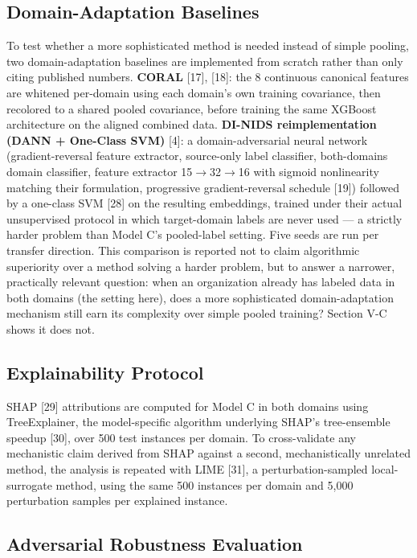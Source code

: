\documentclass[conference]{IEEEtran}
\begin{document}
\subsection{Domain-Adaptation Baselines}

To test whether a more sophisticated method is needed instead of simple pooling, two domain-adaptation baselines are implemented from scratch rather than only citing published numbers. \textbf{CORAL} [17], [18]: the 8 continuous canonical features are whitened per-domain using each domain's own training covariance, then recolored to a shared pooled covariance, before training the same XGBoost architecture on the aligned combined data. \textbf{DI-NIDS reimplementation (DANN + One-Class SVM)} [4]: a domain-adversarial neural network (gradient-reversal feature extractor, source-only label classifier, both-domains domain classifier, feature extractor 15$\rightarrow$32$\rightarrow$16 with sigmoid nonlinearity matching their formulation, progressive gradient-reversal schedule [19]) followed by a one-class SVM [28] on the resulting embeddings, trained under their actual unsupervised protocol in which target-domain labels are never used --- a strictly harder problem than Model C's pooled-label setting. Five seeds are run per transfer direction. This comparison is reported not to claim algorithmic superiority over a method solving a harder problem, but to answer a narrower, practically relevant question: when an organization already has labeled data in both domains (the setting here), does a more sophisticated domain-adaptation mechanism still earn its complexity over simple pooled training? Section V-C shows it does not.

\subsection{Explainability Protocol}

SHAP [29] attributions are computed for Model C in both domains using TreeExplainer, the model-specific algorithm underlying SHAP's tree-ensemble speedup [30], over 500 test instances per domain. To cross-validate any mechanistic claim derived from SHAP against a second, mechanistically unrelated method, the analysis is repeated with LIME [31], a perturbation-sampled local-surrogate method, using the same 500 instances per domain and 5,000 perturbation samples per explained instance.

\subsection{Adversarial Robustness Evaluation}
\end{document}
